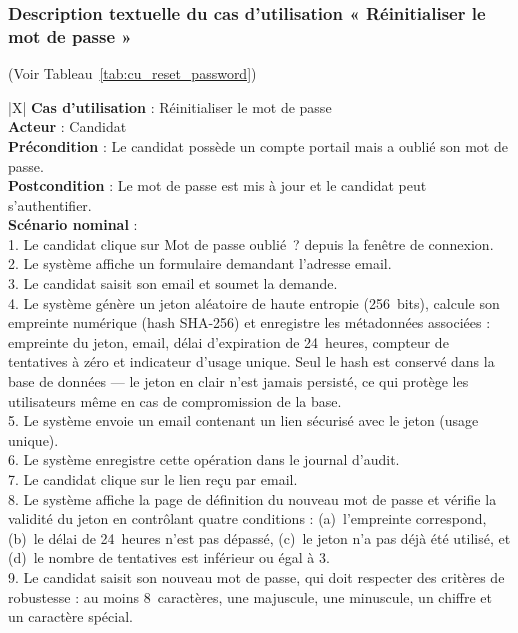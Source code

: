 \subsubsection{Description textuelle du cas d'utilisation « Réinitialiser le mot de passe »}
(Voir Tableau~\ref{tab:cu_reset_password})

\begin{xltabular}{\linewidth}{|X|}
    \hline
    \textbf{Cas d'utilisation} : Réinitialiser le mot de passe \\
    \hline
    \textbf{Acteur} : Candidat \\
    \hline
    \textbf{Précondition} : Le candidat possède un compte portail mais a oublié son mot de passe. \\
    \hline
    \textbf{Postcondition} : Le mot de passe est mis à jour et le candidat peut s'authentifier. \\
    \hline
    \textbf{Scénario nominal} : \\
    1. Le candidat clique sur \og Mot de passe oublié~? \fg depuis la fenêtre de connexion. \\
    2. Le système affiche un formulaire demandant l'adresse email. \\
    3. Le candidat saisit son email et soumet la demande. \\
    4. Le système génère un jeton aléatoire de haute entropie (256~bits), calcule son empreinte numérique (hash SHA-256) et enregistre les métadonnées associées : empreinte du jeton, email, délai d'expiration de 24~heures, compteur de tentatives à zéro et indicateur d'usage unique. Seul le hash est conservé dans la base de données --- le jeton en clair n'est jamais persisté, ce qui protège les utilisateurs même en cas de compromission de la base. \\
    5. Le système envoie un email contenant un lien sécurisé avec le jeton (usage unique). \\
    6. Le système enregistre cette opération dans le journal d'audit. \\
    7. Le candidat clique sur le lien reçu par email. \\
    8. Le système affiche la page de définition du nouveau mot de passe et vérifie la validité du jeton en contrôlant quatre conditions : (a)~l'empreinte correspond, (b)~le délai de 24~heures n'est pas dépassé, (c)~le jeton n'a pas déjà été utilisé, et (d)~le nombre de tentatives est inférieur ou égal à 3. \\
    9. Le candidat saisit son nouveau mot de passe, qui doit respecter des critères de robustesse : au moins 8~caractères, une majuscule, une minuscule, un chiffre et un caractère spécial. \\

\end{xltabular}
